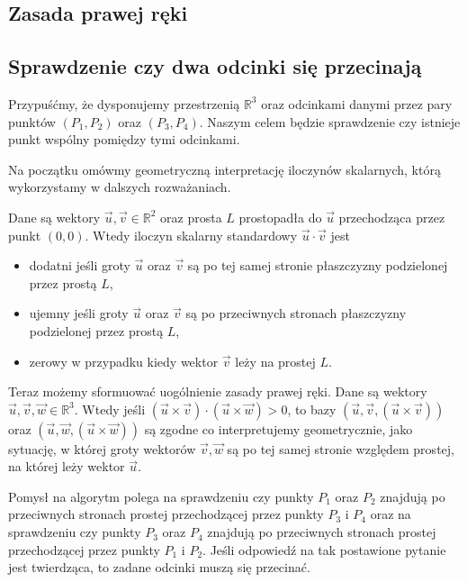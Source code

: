 \subsection{Zasada prawej ręki}

\subsection{Sprawdzenie czy dwa odcinki się przecinają}
Przypuśćmy, że dysponujemy przestrzenią $\mathbb{R}^3$ oraz odcinkami danymi przez pary punktów 
$(P_1, P_2)$ oraz $(P_3, P_4)$. Naszym celem będzie sprawdzenie
czy istnieje punkt wspólny pomiędzy tymi odcinkami.

Na początku omówmy geometryczną interpretację iloczynów skalarnych, którą wykorzystamy w dalszych rozważaniach.

Dane są wektory $\vec{u},\vec{v} \in \mathbb{R}^2$ oraz prosta $L$ prostopadła
do $\vec{u}$ przechodząca przez punkt $(0,0)$. Wtedy iloczyn skalarny 
standardowy $\vec{u} \cdot \vec{v}$
jest 
\begin{itemize}[]
	\item dodatni jeśli groty $\vec{u}$ oraz $\vec{v}$ są po tej samej stronie płaszczyzny podzielonej przez prostą $L$,
	\item ujemny jeśli groty $\vec{u}$ oraz $\vec{v}$ są po  przeciwnych stronach płaszczyzny podzielonej przez prostą $L$,
	\item zerowy w przypadku kiedy wektor $\vec{v}$
	leży na prostej $L$.
\end{itemize}

Teraz możemy sformuować uogólnienie zasady prawej ręki.
Dane są wektory $\vec{u},\vec{v},\vec{w} \in \mathbb{R}^3$.
Wtedy jeśli $(\vec{u} \times \vec{v})
\cdot (\vec{u} \times \vec{w}) > 0$, to bazy
$(\vec{u}, \vec{v},  (\vec{u} \times \vec{v}))$ oraz
$(\vec{u}, \vec{w},  (\vec{u} \times \vec{w}))$ są zgodne
co interpretujemy geometrycznie, jako sytuację, w której 
groty wektorów 
$\vec{v}, \vec{w}$ są po tej samej stronie względem prostej,
na której leży wektor $\vec{u}$.


Pomysł na algorytm polega na sprawdzeniu czy punkty $P_1$
oraz $P_2$ znajdują po przeciwnych stronach prostej 
przechodzącej przez punkty $P_3$ i $P_4$ oraz 
na sprawdzeniu czy punkty $P_3$
oraz $P_4$ znajdują po przeciwnych stronach prostej 
przechodzącej przez punkty $P_1$ i $P_2$. Jeśli odpowiedź
na tak postawione pytanie jest twierdząca, to zadane
odcinki muszą się przecinać.


